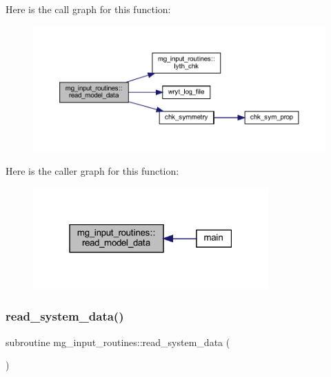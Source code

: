 Here is the call graph for this function\+:
\nopagebreak
\begin{figure}[H]
\begin{center}
\leavevmode
\includegraphics[width=350pt]{namespacemg__input__routines_acd1da063201ad2300b429047265d6c91_cgraph}
\end{center}
\end{figure}
Here is the caller graph for this function\+:
\nopagebreak
\begin{figure}[H]
\begin{center}
\leavevmode
\includegraphics[width=256pt]{namespacemg__input__routines_acd1da063201ad2300b429047265d6c91_icgraph}
\end{center}
\end{figure}
\mbox{\label{namespacemg__input__routines_a77a7419ce373edc9895839fc0d469d78}} 
\subsubsection{\texorpdfstring{read\+\_\+system\+\_\+data()}{read\_system\_data()}}
{\footnotesize\ttfamily subroutine mg\+\_\+input\+\_\+routines\+::read\+\_\+system\+\_\+data (\begin{DoxyParamCaption}{ }\end{DoxyParamCaption})}

